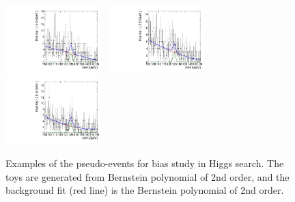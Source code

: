 \begin{figure}[!ht]
  \includegraphics[width=0.33\textwidth]{Fig/BiasStudy/Toys/HJpsiG/TruePdf1_FitPdf1_mu300_sbfit_1237_cat1}~
  \includegraphics[width=0.33\textwidth]{Fig/BiasStudy/Toys/HJpsiG/TruePdf1_FitPdf1_mu300_sbfit_12324_cat1}~
  \includegraphics[width=0.33\textwidth]{Fig/BiasStudy/Toys/HJpsiG/TruePdf1_FitPdf1_mu300_sbfit_12346_cat1}\\
  \caption{Examples of the pseudo-events for bias study in Higgs search. The toys are generated from Bernstein polynomial of 2nd order, and the background fit (red line) is the Bernstein polynomial of 2nd order.\label{fig:Toys_HJpsiG}}
\end{figure}
\clearpage

